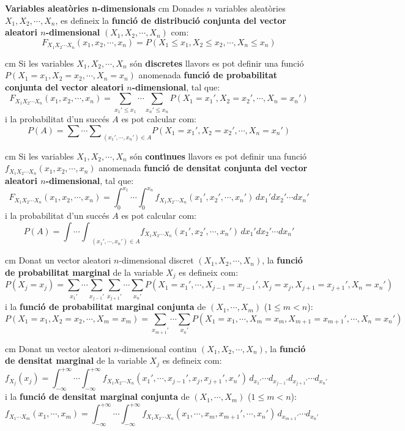 \documentclass{article}
\begin{document}
\noindent
\textbf{\large Variables aleat\`ories n-dimensionals}
 cm
\noindent
Donades $n$ variables aleat\`ories $X_1, X_2, \cdots, X_n$, es defineix la 
\textbf{funci\'o de distribuci\'o conjunta del vector aleatori $n$-dimensional} 
$(X_1, X_2, \cdots, X_n)$ com:
\[
F_{X_1 X_2 \cdots X_n}(x_1, x_2, \cdots, x_n)=P(X_1 \leq x_1, X_2 \leq x_2, \cdots, X_n \leq x_n)
\]

 cm
Si les variables $X_1, X_2, \cdots, X_n$ s\'on \textbf{discretes} llavors es pot definir
una funci\'o $P(X_1 = x_1, X_2 = x_2, \cdots, X_n = x_n)$ anomenada
\textbf{funci\'o de probabilitat conjunta del vector aleatori $n$-dimensional}, tal que:
\[
F_{X_1 X_2 \cdots X_n}(x_1, x_2, \cdots, x_n)=
\sum_{x_1' \leq x_1} \cdots \sum_{x_n' \leq x_n} P(X_1 = x_1', X_2 = x_2', \cdots, X_n = x_n')
\]
\noindent
i la probabilitat d'un succ\'es $A$ es pot calcular com:
\[
P(A)={\sum \cdots \sum}_{(x_1', \cdots, x_n') \in A} P(X_1 = x_1', X_2 = x_2', \cdots, X_n = x_n')
\]


 cm
Si les variables $X_1, X_2, \cdots, X_n$ s\'on \textbf{cont\'\i nues} llavors es pot definir
una funci\'o $f_{X_1 X_2 \cdots X_n}(x_1, x_2, \cdots, x_n)$ anomenada 
\textbf{funci\'o de densitat conjunta del vector aleatori $n$-dimensional}, tal que:
\[
F_{X_1 X_2 \cdots X_n}(x_1, x_2, \cdots, x_n)=
\int_0^{x_1} \cdots \int_0^{x_n} f_{X_1 X_2 \cdots X_n}(x_1', x_2', \cdots, x_n') \, dx_1' dx_2' \cdots dx_n'
\]
\noindent
i la probabilitat d'un succ\'es $A$ es pot calcular com:
\[
P(A)=
{\int \cdots \int}_{(x_1', \cdots, x_n') \in A}  f_{X_1 X_2 \cdots X_n}(x_1', x_2', \cdots, x_n') \, dx_1' dx_2' \cdots dx_n'
\]



 cm
Donat un vector aleatori $n$-dimensional discret $(X_1, X_2, \cdots, X_n)$, 
la \textbf{funci\'o de probabilitat marginal} de la variable $X_j$ es defineix com:
\[
P(X_j=x_j)=\sum_{x_1'} \cdots \sum_{x_{j-1}'} \sum_{x_{j+1}'} \cdots \sum_{x_n'} 
P(X_1 = x_1', \cdots, X_{j-1}=x_{j-1}', X_j=x_j, X_{j+1}=x_{j+1}', X_n = x_n')
\]  
\noindent
i la \textbf{funci\'o de probabilitat marginal conjunta} de $(X_1, \cdots, X_m)$ ($1 \leq m < n$):
\[
P(X_1=x_1, X_2=x_2, \cdots, X_m=x_m)=\sum_{x_{m+1}'} \cdots \sum_{x_n'} 
P(X_1 = x_1, \cdots, X_m=x_m, X_{m+1}=x_{m+1}', \cdots,  X_n = x_n')
\]  
  

 cm
Donat un vector aleatori $n$-dimensional continu $(X_1, X_2, \cdots, X_n)$, 
la \textbf{funci\'o de densitat marginal} de la variable $X_j$ es defineix com:
\[
f_{X_j}(x_j)=\int_{-\infty}^{+\infty} \cdots \int_{-\infty}^{+\infty}
f_{X_1 X_2 \cdots X_n}(x_1', \cdots, x_{j-1}', x_j, x_{j+1}', x_n') \, d_{x_1'} \cdots d_{x_{j-1}'} d_{x_{j+1}'} \cdots d_{x_n'}  
\]  
\noindent
i la \textbf{funci\'o de densitat marginal conjunta} de $(X_1, \cdots, X_m)$ ($1 \leq m < n$):
\[
f_{X_1 \cdots X_m}(x_1, \cdots, x_m)=\int_{-\infty}^{+\infty} \cdots \int_{-\infty}^{+\infty}
f_{X_1 X_2 \cdots X_n}(x_1, \cdots, x_m, x_{m+1}', \cdots, x_n') \,  d_{x_{m+1}'} \cdots d_{x_n'}  
\]  
\end{document}
